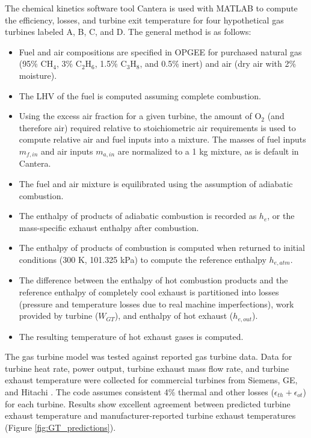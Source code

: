\documentclass[11pt]{report}
\begin{document}
The chemical kinetics software tool Cantera \cite{cantera} is used with MATLAB to compute the efficiency, losses, and turbine exit temperature for four hypothetical gas turbines labeled A, B, C, and D. The general method is as follows:
\begin{itemize}
\item Fuel and air compositions are specified in OPGEE for purchased natural gas (95\% CH$_4$, 3\% C$_2$H$_6$, 1.5\% C$_3$H$_8$, and 0.5\% inert) and air (dry air with 2\% moisture). 
\item The LHV of the fuel is computed assuming complete combustion.
\item Using the excess air fraction for a given turbine, the amount of O$_2$ (and therefore air) required relative to stoichiometric air requirements is used to compute relative air and fuel inputs into a mixture. The masses of fuel inputs $m_{f,in}$ and air inputs $m_{a,in}$ are normalized to a 1 kg mixture, as is default in Cantera.
\item The fuel and air mixture is equilibrated using the assumption of adiabatic combustion.
\item The enthalpy of products of adiabatic combustion is recorded as $h_{e}$, or the mass-specific exhaust enthalpy after combustion.
\item The enthalpy of products of combustion is computed when returned to initial conditions (300 K, 101.325 kPa) to compute the reference enthalpy $h_{e,atm}$.
\item The difference between the enthalpy of hot combustion products and the reference enthalpy of completely cool exhaust is partitioned into losses (pressure and temperature losses due to real machine imperfections), work provided by turbine ($W_{GT}$), and enthalpy of hot exhaust ($h_{e,out}$).
\item The resulting temperature of hot exhaust gases is computed.
\end{itemize}

The gas turbine model was tested against reported gas turbine data. Data for turbine heat rate, power output, turbine exhaust mass flow rate, and turbine exhaust temperature were collected for commercial turbines from Siemens, GE, and Hitachi \cite{Siemens2012, Badeer2012, Farmer2010}. The code assumes consistent 4\% thermal and other losses ($\epsilon_{th} + \epsilon_{ot}$) for each turbine. Results show excellent agreement between predicted turbine exhaust temperature and manufacturer-reported turbine exhaust temperatures (Figure \ref{fig:GT_predictions}).
\end{document}
